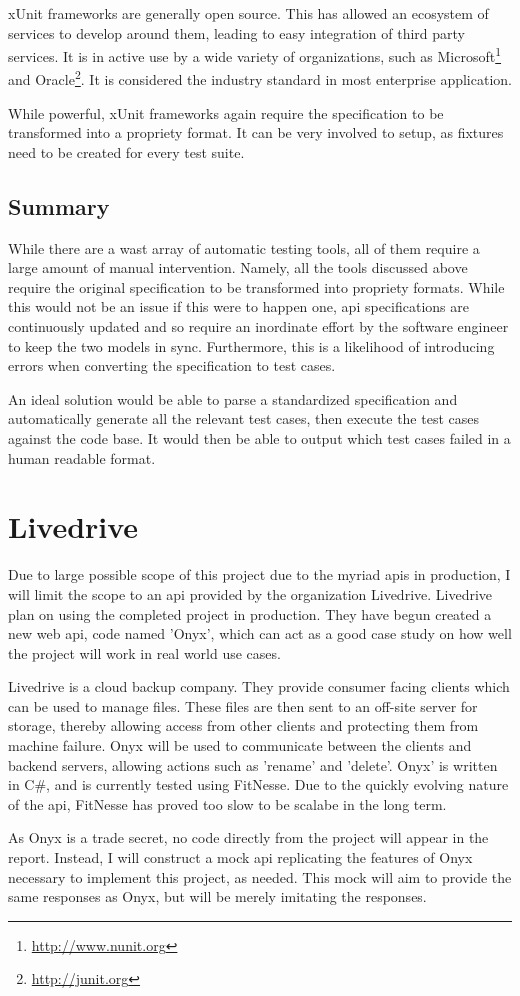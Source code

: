 xUnit frameworks are generally open source. This has allowed an ecosystem of services to develop around them, leading to easy integration of third party services. It is in active use by a wide variety of organizations, such as Microsoft\footnote{\url{http://www.nunit.org}} and Oracle\footnote{\url{http://junit.org}}. It is considered the industry standard in most enterprise application.

While powerful, xUnit frameworks again require the specification to be transformed into a propriety format. It can be very involved to setup, as fixtures need to be created for every test suite.


\subsection{Summary}

While there are a wast array of automatic testing tools, all of them require a large amount of manual intervention. Namely, all the tools discussed above require the original specification to be transformed into propriety formats. While this would not be an issue if this were to happen one, api specifications are continuously updated and so require an inordinate effort by the software engineer to keep the two models in sync. Furthermore, this is a likelihood of introducing errors when converting the specification to test cases.

An ideal solution would be able to parse a standardized specification and automatically generate all the relevant test cases, then execute the test cases against the code base. It would then be able to output which test cases failed in a human readable format.


\section{Livedrive}

Due to large possible scope of this project due to the myriad apis in production, I will limit the scope to an api provided by the organization Livedrive. Livedrive plan on using the completed project in production. They have begun created a new web api, code named 'Onyx', which can act as a good case study on how well the project will work in real world use cases.

Livedrive is a cloud backup company. They provide consumer facing clients which can be used to manage files. These files are then sent to an off-site server for storage, thereby allowing access from other clients and protecting them from machine failure. Onyx will be used to communicate between the clients and backend servers, allowing actions such as 'rename' and 'delete'. Onyx' is written in C\#, and is currently tested using FitNesse. Due to the quickly evolving nature of the api, FitNesse has proved too slow to be scalabe in the long term.

As Onyx is a trade secret, no code directly from the project will appear in the report. Instead, I will construct a mock api replicating the features of Onyx necessary to implement this project, as needed. This mock will aim to provide the same responses as Onyx, but will be merely imitating the responses.